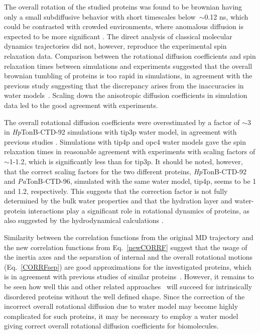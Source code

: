 \documentclass[journal=jpcbfk,manuscript=article]{achemso}
\begin{document}
The overall rotation of the studied proteins was found to be brownian having
only a small subdiffusive behavior with short timescales
below~$\sim$0.12 ns, which could be contrasted with crowded environments,
where anomalous diffusion is expected to be more significant \cite{hofling13}.
The direct analysis of classical molecular dynamics trajectories did not, however,
reproduce the experimental spin relaxation data. Comparison between the rotational 
diffusion coefficients and spin relaxation times between simulations
and experiments suggested that
the overall brownian tumbling of proteins is too rapid in simulations,
in agreement with the previous study suggesting that the discrepancy arises
from the inaccuracies in water models~\cite{wong08}.
Scaling down the anisotropic diffusion coefficients in simulation data
led to the good agreement with experiments.

The overall rotational diffusion coefficients were overestimated by a factor of $\sim$3 in
{\it Hp}TonB-CTD-92 simulations with tip3p water model, in agreement with previous
studies \cite{prompers02,wong08,anderson12}. Simulations with tip4p and opc4
water models gave the spin relaxation times in reasonable agreement with experiments
with scaling factors of $\sim$1-1.2, which is significantly less than for tip3p.
It should be noted, however, that the correct scaling factors for 
the two different proteins, {\it Hp}TonB-CTD-92 and {\it Pa}TonB-CTD-96, simulated with the
same water model, tip4p, seems to be 1 and 1.2, respectively. This suggests
that the correction factor is not fully determined by the bulk water properties
and that the hydration layer and water-protein interactions play a significant
role in rotational dynamics of proteins, as also suggested by the hydrodynamical 
calculations \cite{torre00}.

Similarity between the correlation functions from the original MD trajectory and
the new correlation functions from Eq.~\ref{newCORRF} 
suggest that the usage of the inertia axes
and the separation of internal and the overall rotational motions
(Eq.~\ref{CORRFsep}) are good approximations for the investigated
proteins, which is in agreement with previous studies of similar 
proteins~\cite{wong08,allner15}. However, it remains to be seen
how well this and other related approaches~\cite{prompers02,anderson12} 
will succeed for intrinsically disordered proteins without
the well defined shape. Since the correction of the incorrect overall
rotational diffusion due to water model may become highly complicated for such proteins,
it may be necessary to employ a water model giving correct
overall rotational diffusion coefficients for biomolecules.
\end{document}
